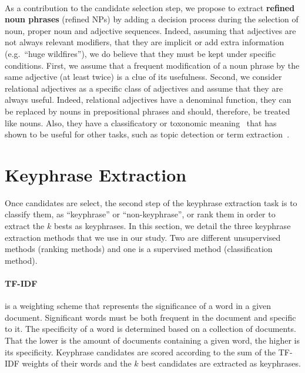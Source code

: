   \paragraph{}
  As a contribution to the candidate selection step, we propose to extract
  \textbf{refined noun phrases} (refined NPs) by adding a decision process
  during the selection of noun, proper noun and adjective sequences. Indeed,
  assuming that adjectives are not always relevant modifiers, that they are
  implicit or add extra information (e.g.~``huge wildfires''), we do believe
  that they must be kept under specific conditions. First, we assume that a
  frequent modification of a noun phrase by the same adjective (at least twice)
  is a clue of its usefulness. Second, we consider relational adjectives as a
  specific class of adjectives and assume that they are always useful. Indeed,
  relational adjectives have a denominal function, they can be replaced by nouns
  in prepositional phrases and should, therefore, be treated like nouns. Also,
  they have a classificatory or toxonomic
  meaning~\cite{mcnally2004relationaladjectives} that has shown to be useful for
  other tasks, such as topic detection or term
  extraction~\cite{daille2001relationaladjectives}.

\section{Keyphrase Extraction}
\label{sec:keyphrase_extraction}
  Once candidates are select, the second step of the keyphrase extraction task
  is to classify them, as ``keyphrase'' or ``non-keyphrase'', or rank them in
  order to extract the $k$ bests as keyphrases. In this section, we detail the
  three keyphrase extraction methods that we use in our study. Two are different
  unsupervised methods (ranking methods) and one is a supervised method
  (classification method).

  \paragraph{TF-IDF~\textnormal{\cite{jones1972tfidf}}} is a weighting scheme
  that represents the significance of a word in a given document. Significant
  words must be both frequent in the document and specific to it. The
  specificity of a word is determined based on a collection of documents. That
  the lower is the amount of documents containing a given word, the higher is
  its specificity. Keyphrase candidates are scored according to the sum of the
  TF-IDF weights of their words and the $k$ best candidates are extracted as
  keyphrases.


